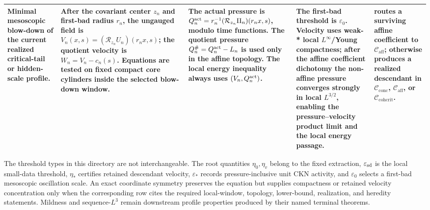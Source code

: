 \documentclass[11pt]{amsart}
\numberwithin{equation}{section}
\theoremstyle{plain}
\theoremstyle{definition}
\theoremstyle{remark}
\newcommand{\eps}{\varepsilon}
\newcommand{\calR}{\mathcal R}
\newcommand{\Cactive}{\mathcal C_{\mathrm{conc}}}
\newcommand{\Caff}{\mathcal C_{\mathrm{aff}}}
\newcommand{\Ccohcrit}{\mathcal C_{\mathrm{cohcrit}}}
\begin{document}
\begin{longtable}{@{}L{0.15\textwidth}L{0.19\textwidth}L{0.20\textwidth}L{0.20\textwidth}L{0.18\textwidth}@{}}
Minimal mesoscopic blow-down of the current realized critical-tail or
hidden-scale profile. &
After the covariant center \(z_n\) and first-bad radius \(r_n\), the ungauged
field is \(V_n(x,s)=(\calR_{z_n}U_n)(r_nx,s)\); the quotient velocity is
\(W_n=V_n-c_n(s)\).  Equations are tested on fixed compact core cylinders
inside the selected blow-down window. &
The actual pressure is
\(Q_n^{\rm act}=r_n^{-1}(\calR_{z_n}\Pi_n)(r_nx,s)\), modulo time functions.
The quotient pressure \(Q_n^\#=Q_n^{\rm act}-L_n\) is used only in the affine
topology.  The local energy inequality always uses \((V_n,Q_n^{\rm act})\). &
The first-bad threshold is \(\eps_0\).  Velocity uses weak-* local
\(L^\infty\)/Young compactness; after the affine coefficient dichotomy the
non-affine pressure converges strongly in local \(L^{3/2}\), enabling the
pressure--velocity product limit and the local energy passage. &
routes a surviving affine coefficient to \(\Caff\); otherwise
 produces a realized descendant in
\(\Cactive\), \(\Caff\), or \(\Ccohcrit\).\\
\hline
\end{longtable}
\endgroup

The threshold types in this directory are not interchangeable.  The root
quantities \(\eta_0,\eta_v\) belong to the fixed extraction,
\(\eps_{\rm sd}\) is the local small-data threshold, \(\eta_*\) certifies
retained descendant velocity, \(\eps_*\) records pressure-inclusive unit CKN
activity, and \(\eps_0\) selects a first-bad mesoscopic oscillation scale.  An
exact coordinate symmetry preserves the equation but supplies compactness or
retained velocity concentration only when the corresponding row cites the
required local-window, topology, lower-bound, realization, and heredity
statements.  Mildness and sequence-\(L^3\) remain downstream profile properties
produced by their named terminal theorems.
\end{document}
